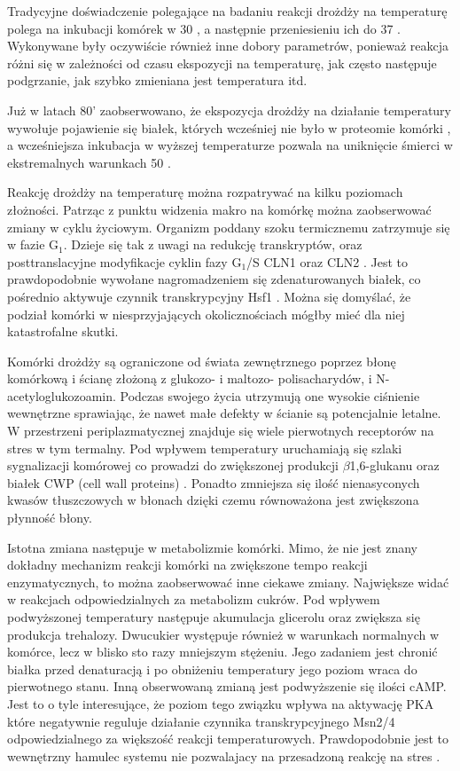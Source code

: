 \documentclass{pracamgr}
\begin{document}
Tradycyjne doświadczenie polegające na badaniu reakcji drożdży na temperaturę polega na inkubacji komórek w 30 \textcelsius, a
następnie przeniesieniu ich do 37 \textcelsius. Wykonywane były oczywiście również inne dobory parametrów, ponieważ 
reakcja różni się w zależności od czasu ekspozycji na temperaturę, jak często następuje podgrzanie, jak szybko zmieniana
jest temperatura itd.

Już w latach 80' zaobserwowano, że ekspozycja drożdży na działanie temperatury wywołuje pojawienie się białek, których 
wcześniej nie było w proteomie komórki \cite{Miller1979}, a wcześniejsza inkubacja w wyższej temperaturze pozwala 
na uniknięcie śmierci w ekstremalnych warunkach 50 \textcelsius \cite{Mcalister1980}.

Reakcję drożdży na temperaturę można rozpatrywać na kilku poziomach złożności. Patrząc z punktu widzenia makro na komórkę
można zaobserwować zmiany w cyklu życiowym. Organizm poddany szoku termicznemu zatrzymuje się w fazie G$_1$. Dzieje się tak 
z uwagi na redukcję transkryptów, oraz posttranslacyjne modyfikacje cyklin fazy G$_1$/S CLN1 oraz CLN2 \cite{CyclinArrest}. Jest to prawdopodobnie
wywołane nagromadzeniem się zdenaturowanych białek, co pośrednio aktywuje czynnik transkrypcyjny Hsf1 \cite{MisfoldedProteins}. Można się domyślać, że 
podział komórki w niesprzyjających okolicznościach mógłby mieć dla niej katastrofalne skutki.	

Komórki drożdży są ograniczone od świata zewnętrznego poprzez błonę komórkową i ścianę złożoną z glukozo- i maltozo- polisacharydów,
 i N-acetyloglukozoamin. Podczas swojego życia utrzymują one wysokie ciśnienie wewnętrzne sprawiając, że nawet małe defekty w ścianie 
 są potencjalnie letalne. W przestrzeni periplazmatycznej znajduje się wiele pierwotnych receptorów na stres w tym termalny.
 Pod wpływem temperatury uruchamiają się szlaki sygnalizacji komórowej co prowadzi do zwiększonej produkcji $\beta$1,6-glukanu
 oraz białek CWP (cell wall proteins) \cite{CellWall}. Ponadto zmniejsza się ilość nienasyconych kwasów tłuszczowych w błonach \cite{CellLipids}
 dzięki czemu równoważona jest zwiększona płynność błony.
 
 Istotna zmiana następuje w metabolizmie komórki. Mimo, że nie jest znany dokładny mechanizm reakcji komórki na zwiększone 
 tempo reakcji enzymatycznych, to można zaobserwować inne ciekawe zmiany. Największe widać w reakcjach odpowiedzialnych za
 metabolizm cukrów. Pod wpływem podwyższonej temperatury następuje akumulacja glicerolu \cite{GlycerolAccumulate} oraz
 zwiększa się produkcja trehalozy. Dwucukier występuje również w warunkach normalnych w komórce, lecz w blisko sto razy mniejszym stężeniu. 
 Jego zadaniem jest chronić białka przed denaturacją i po obniżeniu temperatury jego poziom wraca do pierwotnego stanu. Inną obserwowaną
 zmianą jest podwyższenie się ilości cAMP. Jest to o tyle interesujące, że poziom tego związku wpływa na aktywację PKA które negatywnie
 reguluje działanie czynnika transkrypcyjnego Msn2/4 odpowiedzialnego za większość reakcji temperaturowych. Prawdopodobnie 
 jest to wewnętrzny hamulec systemu nie pozwalajacy na przesadzoną reakcję na stres \cite{Blomberg00,StressResponse99}.
\end{document}
